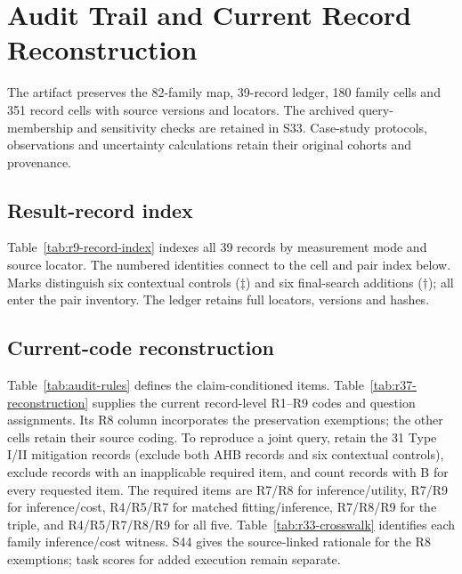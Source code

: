 \section{Audit Trail and Current Record Reconstruction}\label{app:reconstruction}
The artifact preserves the 82-family map, 39-record ledger, 180 family cells and 351 record cells with source versions and locators. The archived query-membership and sensitivity checks are retained in S33. Case-study protocols, observations and uncertainty calculations retain their original cohorts and provenance.

\subsection{Result-record index}\label{app:records}
Table~\ref{tab:r9-record-index} indexes all 39 records by measurement mode and source locator. The numbered identities connect to the cell and pair index below. Marks distinguish six contextual controls ($\ddagger$) and six final-search additions ($\dagger$); all enter the pair inventory. The ledger retains full locators, versions and hashes.


\subsection{Current-code reconstruction}
Table~\ref{tab:audit-rules} defines the claim-conditioned items. Table~\ref{tab:r37-reconstruction} supplies the current record-level R1--R9 codes and question assignments. Its R8 column incorporates the preservation exemptions; the other cells retain their source coding. To reproduce a joint query, retain the 31 Type I/II mitigation records (exclude both AHB records and six contextual controls), exclude records with an inapplicable required item, and count records with B for every requested item. The required items are R7/R8 for inference/utility, R7/R9 for inference/cost, R4/R5/R7 for matched fitting/inference, R7/R8/R9 for the triple, and R4/R5/R7/R8/R9 for all five. Table~\ref{tab:r33-crosswalk} identifies each family inference/cost witness. S44 gives the source-linked rationale for the R8 exemptions; task scores for added execution remain separate.






